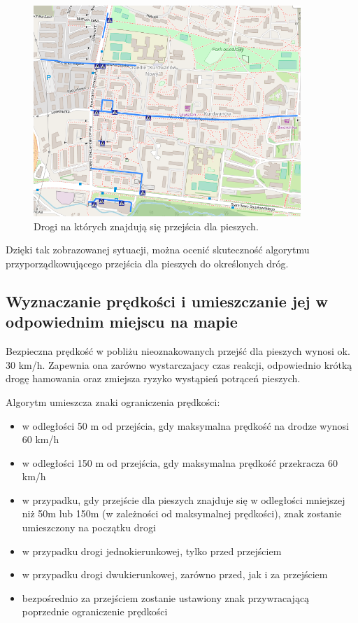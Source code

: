 \begin{figure}[h]
\caption{Drogi na których znajdują się przejścia dla pieszych.}
\label{sec:PrzejscieDrogi}
\centering
\includegraphics[width=0.9\textwidth]{PrzejscieDrogi}
\end{figure}

Dzięki tak zobrazowanej sytuacji, można ocenić skuteczność algorytmu przyporządkowującego przejścia dla pieszych do określonych dróg.

\subsection{Wyznaczanie prędkości i umieszczanie jej w odpowiednim miejscu na mapie}

Bezpieczna prędkość w pobliżu nieoznakowanych przejść dla pieszych wynosi ok. 30 km/h. Zapewnia ona zarówno wystarczajacy czas reakcji, odpowiednio krótką drogę hamowania oraz zmiejsza ryzyko wystąpień potrąceń pieszych. 

Algorytm umieszcza znaki ograniczenia prędkości:
\begin{itemize}
\item w odległości 50 m od przejścia, gdy maksymalna prędkość na drodze wynosi 60 km/h
\item w odległości 150 m od przejścia, gdy maksymalna prędkość przekracza 60 km/h
\item w przypadku, gdy przejście dla pieszych znajduje się w odległości mniejszej niż 50m lub 150m (w zależności od maksymalnej prędkości), znak zostanie umieszczony na początku drogi
\item w przypadku drogi jednokierunkowej, tylko przed przejściem
\item w przypadku drogi dwukierunkowej, zarówno przed, jak i za przejściem
\item bezpośrednio za przejściem zostanie ustawiony znak przywracającą poprzednie ograniczenie prędkości 
\end{itemize}


